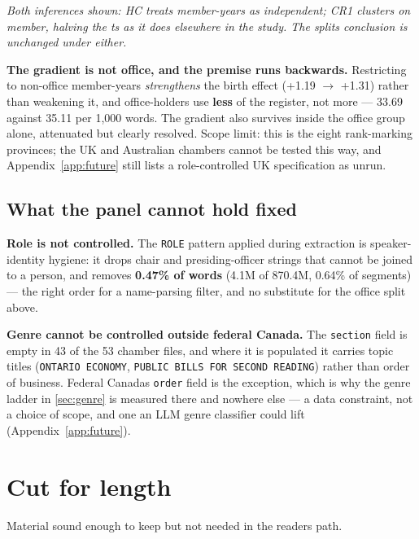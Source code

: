 \emph{Both inferences shown: HC treats member-years as independent; CR1 clusters
on member, halving the t\textquotesingle s as it does elsewhere in the study. The split\textquotesingle s
conclusion is unchanged under either.}

\textbf{The gradient is not office, and the premise runs backwards.} Restricting to
non-office member-years \emph{strengthens} the birth effect (+1.19 \(\rightarrow\) +1.31) rather
than weakening it, and office-holders use \textbf{less} of the register, not more ---
33.69 against 35.11 per 1,000 words. The gradient also survives inside the
office group alone, attenuated but clearly resolved. Scope limit: this is the
eight rank-marking provinces; the UK and Australian chambers cannot be tested
this way, and Appendix~\ref{app:future} still lists a role-controlled UK specification as unrun.

\subsection{What the panel cannot hold fixed}\label{sec:panel-limits}

\textbf{Role is not controlled.} The \texttt{ROLE} pattern applied during extraction is
speaker-identity hygiene: it drops chair and presiding-officer strings that
cannot be joined to a person, and removes \textbf{0.47\% of words} (4.1M of 870.4M,
0.64\% of segments) --- the right order for a name-parsing filter, and no
substitute for the office split above.

\textbf{Genre cannot be controlled outside federal Canada.} The \texttt{section} field is
empty in 43 of the 53 chamber files, and where it is populated it carries topic
titles (\texttt{ONTARIO\ ECONOMY}, \texttt{PUBLIC\ BILLS\ FOR\ SECOND\ READING}) rather than order
of business. Federal Canada\textquotesingle s \texttt{order} field is the exception, which is why the
genre ladder in \cref{sec:genre} is measured there and nowhere else --- a data constraint,
not a choice of scope, and one an LLM genre classifier could lift (Appendix~\ref{app:future}).

\section{Cut for length}\label{app:cut}

Material sound enough to keep but not needed in the reader\textquotesingle s path.

